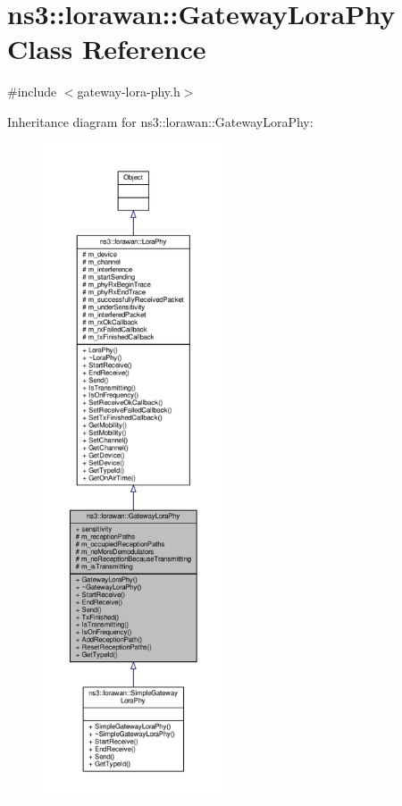 \hypertarget{classns3_1_1lorawan_1_1GatewayLoraPhy}{}\section{ns3\+:\+:lorawan\+:\+:Gateway\+Lora\+Phy Class Reference}
\label{classns3_1_1lorawan_1_1GatewayLoraPhy}


{\ttfamily \#include $<$gateway-\/lora-\/phy.\+h$>$}



Inheritance diagram for ns3\+:\+:lorawan\+:\+:Gateway\+Lora\+Phy\+:
\nopagebreak
\begin{figure}[H]
\begin{center}
\leavevmode
\includegraphics[height=550pt]{classns3_1_1lorawan_1_1GatewayLoraPhy__inherit__graph}
\end{center}
\end{figure}


